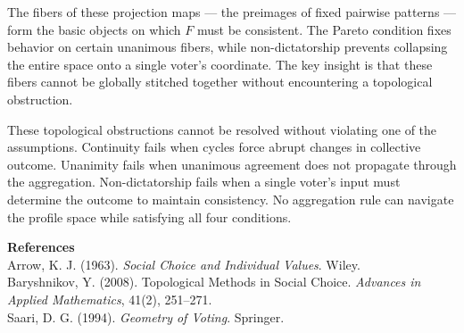 \begin{technical}
The fibers of these projection maps — the preimages of fixed pairwise patterns — form the basic objects on which \(F\) must be consistent. The Pareto condition fixes behavior on certain unanimous fibers, while non-dictatorship prevents collapsing the entire space onto a single voter’s coordinate. The key insight is that these fibers cannot be globally stitched together without encountering a topological obstruction.

These topological obstructions cannot be resolved without violating one of the assumptions. Continuity fails when cycles force abrupt changes in collective outcome. Unanimity fails when unanimous agreement does not propagate through the aggregation. Non-dictatorship fails when a single voter’s input must determine the outcome to maintain consistency. No aggregation rule can navigate the profile space while satisfying all four conditions. 

\vspace{0.5em}
\noindent\textbf{References}\\
Arrow, K. J. (1963). \textit{Social Choice and Individual Values}. Wiley.\\
Baryshnikov, Y. (2008). Topological Methods in Social Choice. \textit{Advances in Applied Mathematics}, 41(2), 251–271.\\
Saari, D. G. (1994). \textit{Geometry of Voting}. Springer.
\end{technical}
